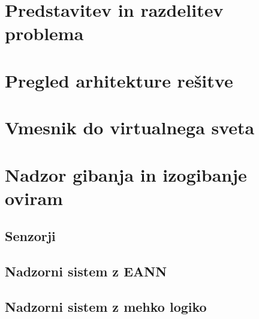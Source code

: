 \documentclass[a4paper,10pt]{article}
\begin{document}


\section{Predstavitev in razdelitev problema}

\section{Pregled arhitekture rešitve}

\section{Vmesnik do virtualnega sveta}

\section{Nadzor gibanja in izogibanje oviram}

\subsection{Senzorji}

\subsection{Nadzorni sistem z EANN}

\subsection{Nadzorni sistem z mehko logiko}
\end{document}
